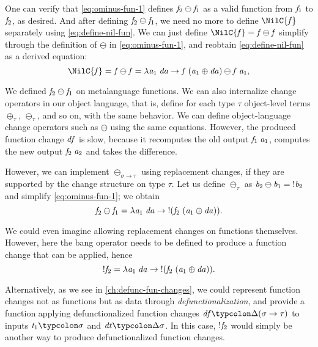 One can verify that \cref{eq:ominus-fun-1} defines \ensuremath{\Varid{f}_{2}\ominus \Varid{f}_{1}} as a valid function from \ensuremath{\Varid{f}_{1}} to \ensuremath{\Varid{f}_{2}}, as desired.
And after defining \ensuremath{\Varid{f}_{2}\ominus \Varid{f}_{1}}, we need no more to define
\ensuremath{\NilC{\Varid{f}}} separately using \cref{eq:define-nil-fun}.
We can just define \ensuremath{\NilC{\Varid{f}}\mathrel{=}\Varid{f}\ominus \Varid{f}} simplify through the definition
of \ensuremath{\ominus } in \cref{eq:ominus-fun-1}, and reobtain \cref{eq:define-nil-fun}
as a derived equation:
%
\[
  \ensuremath{\NilC{\Varid{f}}\mathrel{=}\Varid{f}\ominus \Varid{f}\mathrel{=}\lambda \Varid{a}_{1}\;\Varid{da}\to \Varid{f}\;(\Varid{a}_{1}\oplus \Varid{da})\ominus \Varid{f}\;\Varid{a}_{1}},
\]

We defined \ensuremath{\Varid{f}_{2}\ominus \Varid{f}_{1}} on metalanguage functions. We can also internalize
change operators in our object language, that is, define for each type \ensuremath{\tau}
object-level terms \ensuremath{\oplus_{\tau}}, \ensuremath{\ominus_{\tau}}, and so on, with the same
behavior.
We can define object-language change operators such as \ensuremath{\ominus } using the same
equations. However, the produced function change \ensuremath{\Varid{df}} is slow, because it
recomputes the old output \ensuremath{\Varid{f}_{1}\;\Varid{a}_{1}}, computes the new output \ensuremath{\Varid{f}_{2}\;\Varid{a}_{2}} and takes the
difference.

However, we can implement \ensuremath{\ominus_{\sigma\to \tau}} using replacement changes, if
they are supported by the change structure on type \ensuremath{\tau}.
Let us define \ensuremath{\ominus_{\tau}} as \ensuremath{\Varid{b}_{2}\ominus \Varid{b}_{1}\mathrel{=}\mathbin{!}\Varid{b}_{2}} and simplify
\cref{eq:ominus-fun-1}; we obtain
\[\mathit{f}_{2}\ominus \mathit{f}_{1}\mathrel{=}\lambda \mathit{a}_{1}\;\mathit{da}\to \mathbin{!}(\mathit{f}_{2}\;(\mathit{a}_{1}\oplus \mathit{da})).\]

We could even imagine allowing replacement changes on functions
themselves. However, here the bang operator needs to be defined
to produce a function change that can be applied, hence
\[\mathbin{!}\mathit{f}_{2}\mathrel{=}\lambda \mathit{a}_{1}\;\mathit{da}\to \mathbin{!}(\mathit{f}_{2}\;(\mathit{a}_{1}\oplus \mathit{da})).\]

Alternatively, as we see in
\cref{ch:defunc-fun-changes}, we could represent function changes
not as functions but as data through \emph{defunctionalization},
and provide a function applying defunctionalized function changes
\ensuremath{\Varid{df}\typcolon\Delta (\sigma\to \tau)} to inputs \ensuremath{\Varid{t}_{1}\typcolon\sigma} and \ensuremath{\Varid{dt}\typcolon\Delta \sigma}. In this case, \ensuremath{\mathbin{!}\Varid{f}_{2}} would simply be another way to
produce defunctionalized function changes.

